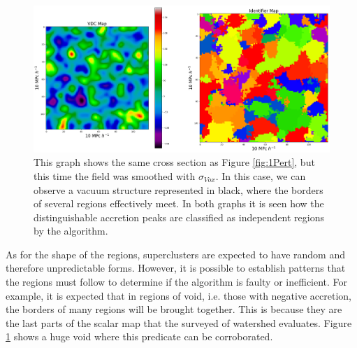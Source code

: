 \begin{figure}[!h]
    \centering
    \includegraphics[width=380pt]{3PlotPert_48.png}
    \caption{This graph shows the same cross section as Figure \ref{fig:1Pert}, but this time the field was smoothed with $\sigma_{Vox}$. In this case, we can observe a vacuum structure represented in black, where the borders of several regions effectively meet. In both graphs it is seen how the distinguishable accretion peaks are classified as independent regions by the algorithm.}
    \label{fig:3Pert}
\end{figure}
As for the shape of the regions, superclusters are expected to have random and therefore unpredictable forms. However, it is possible to establish patterns that the regions must follow to determine if the algorithm is faulty or inefficient. For example, it is expected that in regions of void, i.e. those with negative accretion, the borders of many regions will be brought together. This is because they are the last parts of the scalar map that the surveyed of watershed evaluates. Figure \ref{fig:3Pert} shows a huge void where this predicate can be corroborated.



